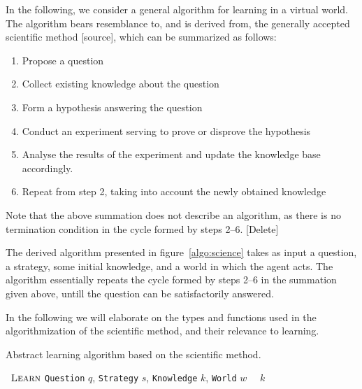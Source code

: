 \documentclass[../Master.tex]{subfiles}
\begin{document}
In the following, we consider a general algorithm for learning in a virtual world. The algorithm bears resemblance to, and is derived from, the generally accepted scientific method [source], which can be summarized as follows:

\begin{enumerate}
    \item Propose a question
    \item Collect existing knowledge about the question
    \item Form a hypothesis answering the question
    \item Conduct an experiment serving to prove or disprove the hypothesis
    \item Analyse the results of the experiment and update the knowledge base accordingly.
    \item Repeat from step 2, taking into account the newly obtained knowledge
\end{enumerate}

Note that the above summation does not describe an algorithm, as there is no termination condition in the cycle formed by steps 2--6. [Delete]

The derived algorithm presented in figure~\ref{algo:science} takes as input a question, a strategy, some initial knowledge, and a world in which the agent acts. The algorithm essentially repeats the cycle formed by steps 2--6 in the summation given above, untill the question can be satisfactorily answered.

In the following we will elaborate on the types and functions used in the algorithmization of the scientific method, and their relevance to learning.

\begin{algorithm}
    \caption{Abstract learning algorithm based on the scientific method.}\label{algo:science}

    \begin{algorithmic}
        \Function~{$\textsc{Learn}$} {\texttt{Question} $q$, \texttt{Strategy} $s$, \texttt{Knowledge} $k$, \texttt{World} $w$}
                \Else%
                \EndIf%
            \EndWhile%
            \State~\Return~$k$
        \EndFunction%
    \end{algorithmic}
\end{algorithm}
\end{document}
